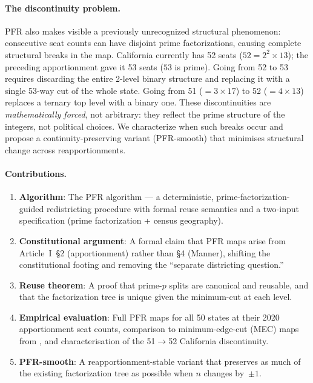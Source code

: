 \paragraph{The discontinuity problem.}
PFR also makes visible a previously unrecognized structural phenomenon:
consecutive seat counts can have disjoint prime factorizations, causing
complete structural breaks in the map. California currently has 52 seats
($52 = 2^2 \times 13$); the preceding apportionment gave it 53 seats
($53$ is prime). Going from 52 to 53 requires discarding the entire
2-level binary structure and replacing it with a single 53-way cut of the
whole state. Going from 51 ($= 3 \times 17$) to 52 ($= 4 \times 13$)
replaces a ternary top level with a binary one. These discontinuities are
\emph{mathematically forced}, not arbitrary: they reflect the prime
structure of the integers, not political choices. We characterize when such
breaks occur and propose a continuity-preserving variant (PFR-smooth) that
minimises structural change across reapportionments.

\paragraph{Contributions.}
\begin{enumerate}
  \item \textbf{Algorithm}: The PFR algorithm --- a deterministic,
        prime-factorization-guided redistricting procedure with formal
        reuse semantics and a two-input specification (prime factorization
        + census geography).
  \item \textbf{Constitutional argument}: A formal claim that PFR maps
        arise from Article~I~\S2 (apportionment) rather than \S4 (Manner),
        shifting the constitutional footing and removing the ``separate
        districting question.''
  \item \textbf{Reuse theorem}: A proof that prime-$p$ splits are
        canonical and reusable, and that the factorization tree is unique
        given the minimum-cut at each level.
  \item \textbf{Empirical evaluation}: Full PFR maps for all 50 states at
        their 2020 apportionment seat counts, comparison to minimum-edge-cut
        (MEC) maps from \citet{dellaLibera2026mec}, and characterisation of
        the 51$\to$52 California discontinuity.
  \item \textbf{PFR-smooth}: A reapportionment-stable variant that preserves
        as much of the existing factorization tree as possible when $n$
        changes by~$\pm 1$.
\end{enumerate}

